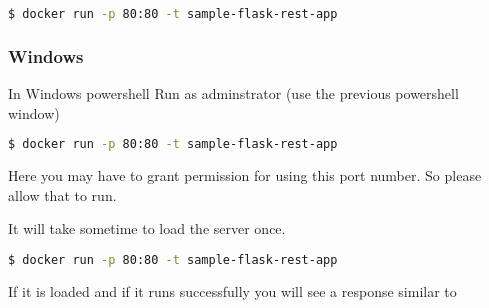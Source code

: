 \begin{lstlisting}[language=bash]
$ docker run -p 80:80 -t sample-flask-rest-app
\end{lstlisting}

\subsubsection{Windows}

In Windows powershell Run as adminstrator (use the previous powershell
window)

\begin{lstlisting}[language=bash]
$ docker run -p 80:80 -t sample-flask-rest-app
\end{lstlisting}

Here you may have to grant permission for using this port number. So
please allow that to run.

It will take sometime to load the server once.

\begin{lstlisting}[language=bash]
$ docker run -p 80:80 -t sample-flask-rest-app
\end{lstlisting}

If it is loaded and if it runs successfully you will see a response similar to 

